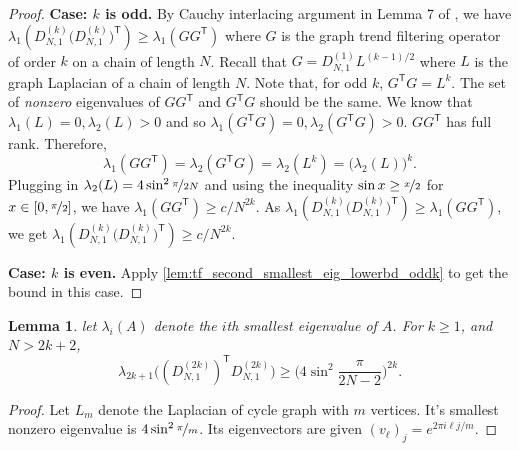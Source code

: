 \documentclass[ejs,noshowframe]{imsart}
\theoremstyle{plain}
\newtheorem{lemma}[theorem]{Lemma}
\theoremstyle{definition}
\renewcommand{\top}{\mathsf{T}}
\begin{document}
\begin{appendix}
\begin{proof}
	\textbf{Case: $k$ is odd.} By Cauchy interlacing argument in Lemma 7 of 
	\cite{sadhanala2021multivariate}, we have $\lambda_1(D^{(k)}_{N,1} 
	\big(D^{(k)}_{N,1} \big)^\top) \ge \lambda_1(GG^\top)$ 
	where $G$ is the 
	graph trend filtering operator of order $k$ on a chain of length $N$.
	Recall that $G = D^{(1)}_{N,1} L^{(k-1)/2}$  where $L$ is the graph 
	Laplacian of a chain of length $N$.
	Note that, for odd $k$, $G^\top G = L^{k}$.
	The set of 
	\textit{nonzero} eigenvalues of $GG^\top$ and $G^\top G$ should be the same. 
	We know that
	$\lambda_1(L) = 0, \lambda_2(L) > 0$ and so 
	$\lambda_1(G^\top G) = 0, \lambda_2(G^\top G) > 0$.
	$GG^\top$ has full rank. 
	Therefore,
	$$\lambda_1(GG^\top) = \lambda_2(G^\top G) = \lambda_2(L^{k}) = 
	\big(\lambda_2(L) \big)^{k}.$$
	Plugging in $\lambda_2(L) = 4 \sin^2 \nicefrac{\pi}{2N}$ and using the 
	inequality $\sin x \geq \nicefrac{x}{2}$ for $x\in [0, \nicefrac{\pi}{2}]$, 
	we have
	$\lambda_1(GG^\top) \geq c/N^{2k}$. 
	As $\lambda_1(D^{(k)}_{N,1} 
	\big(D^{(k)}_{N,1} \big)^\top) \ge \lambda_1(GG^\top)$, we get 
	$\lambda_1(D^{(k)}_{N,1} \big(D^{(k)}_{N,1} \big)^\top)	\geq c / N^{2k}$.
	
	
  \textbf{Case: $k$ is even.}
  Apply \autoref{lem:tf_second_smallest_eig_lowerbd_oddk} to get the bound in 
  this case.
		
	
\end{proof}

\begin{lemma}
	\label{lem:tf_second_smallest_eig_lowerbd_oddk}
	let $\lambda_i(A)$ denote the $i$th smallest 	eigenvalue of $A$.
	For $k\ge 1$, and $N > 2k+2$,
	\[
	\lambda_{2k+1} \big( (D^{(2k)}_{N,1})^\top  D^{(2k)}_{N,1} \big) \ge 
	\big( 4 \sin^2 \frac{\pi}{2N-2} \big)^{2k}.
	\]
\end{lemma}
\begin{proof}
	Let $L_m$ denote the Laplacian of cycle graph with $m$ vertices.
It's smallest nonzero eigenvalue is $ 4 \sin^2 \nicefrac{\pi}{m}$. Its 
eigenvectors are given $ 
	(v_\ell)_j = e^{2\pi i \ell j / m}.$
	

\end{proof}
\end{appendix}
\end{document}
